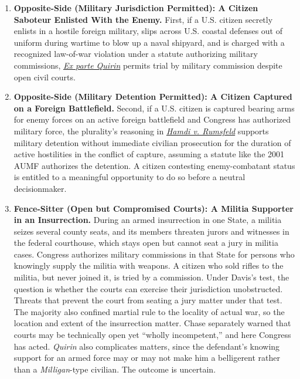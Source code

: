 \documentclass[12pt]{article}
\begin{document}
\begin{enumerate}
\item \textbf{Opposite-Side (Military Jurisdiction Permitted): A Citizen Saboteur Enlisted With the Enemy.} First, if a U.S. citizen secretly enlists in a hostile foreign military, slips across U.S. coastal defenses out of uniform during wartime to blow up a naval shipyard, and is charged with a recognized law-of-war violation under a statute authorizing military commissions, \href{https://supreme.justia.com/cases/federal/us/317/1/}{\textit{Ex parte Quirin}} permits trial by military commission despite open civil courts.

\item \textbf{Opposite-Side (Military Detention Permitted): A Citizen Captured on a Foreign Battlefield.} Second, if a U.S. citizen is captured bearing arms for enemy forces on an active foreign battlefield and Congress has authorized military force, the plurality's reasoning in \href{https://supreme.justia.com/cases/federal/us/542/507/}{\textit{Hamdi v. Rumsfeld}} supports military detention without immediate civilian prosecution for the duration of active hostilities in the conflict of capture, assuming a statute like the 2001 AUMF authorizes the detention. A citizen contesting enemy-combatant status is entitled to a meaningful opportunity to do so before a neutral decisionmaker.

\item \textbf{Fence-Sitter (Open but Compromised Courts): A Militia Supporter in an Insurrection.} During an armed insurrection in one State, a militia seizes several county seats, and its members threaten jurors and witnesses in the federal courthouse, which stays open but cannot seat a jury in militia cases. Congress authorizes military commissions in that State for persons who knowingly supply the militia with weapons. A citizen who sold rifles to the militia, but never joined it, is tried by a commission. Under Davis's test, the question is whether the courts can exercise their jurisdiction unobstructed. Threats that prevent the court from seating a jury matter under that test. The majority also confined martial rule to the locality of actual war, so the location and extent of the insurrection matter. Chase separately warned that courts may be technically open yet ``wholly incompetent,'' and here Congress has acted. \textit{Quirin} also complicates matters, since the defendant's knowing support for an armed force may or may not make him a belligerent rather than a \textit{Milligan}-type civilian. The outcome is uncertain.

\end{enumerate}
\end{document}
